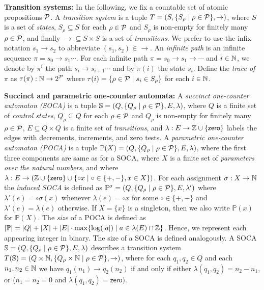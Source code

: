 \documentclass[times,envcountsame]{llncs}
\newcommand{\prop}{\rho}
\newcommand{\zero}{\ensuremath{\mathsf{zero}}}
\newcommand{\trace}{\ensuremath{\tau}}
\newcommand{\Poca}{\mathbb{P}}
\newcommand{\Soca}{\mathbb{S}}
\begin{document}
\noindent
\textbf{Transition systems: }
In the following, we fix a countable set of atomic propositions $\mathcal{P}$.
A {\em transition system} is a tuple $T=(S,\{S_\prop\mid \prop\in\Prop\},\rightarrow)$, where
$S$ is a set of {\em states}, $S_\prop\subseteq S$ for each $\prop\in\Prop$ and
$S_\prop$ is
non-empty for finitely many $\prop\in\Prop$, and finally
$\rightarrow \subseteq S\times S$ is a set of {\em transitions}.
We prefer to use the infix notation $s_1\rightarrow s_2$ to abbreviate
$(s_1,s_2)\in\rightarrow$.
 An {\em infinite path} is an infinite sequence
$\pi=s_0\rightarrow s_1\cdots$.
For each infinite path
$\pi= s_0\rightarrow s_1 \rightarrow \cdots$ and
$i\in\mathbb{N}$, we denote by $\pi^i$ the path $s_i\rightarrow s_{i+1}\cdots$
and by $\pi(i)$ the state $s_i$.
Define the {\em trace of $\pi$} as $\trace(\pi):\N\rightarrow2^\Prop$ where
$\trace(i)=\{\prop\in\Prop\mid s_i\in S_\prop\}$ for each $i\in\mathbb{N}$.
\bigskip

\noindent
\textbf{Succinct and parametric one-counter automata: }
A {\em succinct one-counter automaton (SOCA)} is a tuple
 $\Soca=(Q,\{Q_\prop\mid \prop\in\Prop\},E,\lambda)$, where $Q$ is a finite set
of {\em control states}, $Q_\prop\subseteq Q$ for each $\prop\in\Prop$ and
$Q_\rho$ is non-empty for finitely many $\prop\in\Prop$,
$E\subseteq Q\times Q$ is a finite set of {\em transitions}, and
$\lambda:E\rightarrow \Z\cup\{\zero\}$ labels the edges with decrements,
increments, and zero tests.
A {\em parametric one-counter automaton (POCA)} is a tuple
$\Poca(X)=(Q,\{Q_\prop\mid\prop\in\Prop\},E,\lambda)$, where the first
three components are same as for a SOCA,
where $X$ is a finite set of {\em parameters over the natural numbers},
and where $\lambda:E\rightarrow
(\Z\cup\{\zero\}\cup\{\circ x\mid\circ\in\{+,-\}, x\in X\})$.
For each assignment $\sigma:X\rightarrow\mathbb{N}$  the
{\em induced SOCA} is defined as $\Poca^\sigma=(Q,\{Q_\prop\mid\prop\in\Prop\},E,\lambda')$
where $\lambda'(e)=\circ\sigma(x)$ whenever $\lambda(e)=\circ x$
for some $\circ\in\{+,-\}$ and $\lambda'(e)=\lambda(e)$ otherwise.
If $X=\{x\}$ is a singleton, then we also write $\Poca(x)$ for $\Poca(X)$.
The {\em size} of a POCA is defined as
$|\Poca|=|Q|+|X|+|E|\cdot\max\{\log(|a|)\mid a\in\lambda(E)\cap\Z\}$.
Hence, we represent each appearing
integer in binary.
The size of a SOCA is defined analogously.
A SOCA $\Soca=(Q,\{Q_\prop\mid \prop\in\Prop\},E,\lambda)$ describes a transition system $T(\Soca)=(Q\times\N,\{Q_\prop\times\N\mid
\prop\in\Prop\}, \rightarrow)$, where for each $q_1,q_2\in Q$ and each
$n_1,n_2\in\mathbb{N}$ we have $q_1(n_1)\rightarrow q_2(n_2)$ if and only
if either $\lambda(q_1,q_2)=n_2-n_1$, or
($n_1=n_2=0$ and $\lambda(q_1,q_2)=\zero)$.
\end{document}
